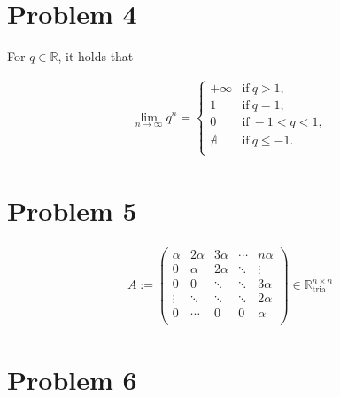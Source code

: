 \documentclass[]{article}
\begin{document}
\newpage
\section*{Problem 4}

For $q \in \mathbb{R}$, it holds that

\begin{align*}
	\lim\limits_{n \to \infty} q^n = 
	\left\{
	\begin{array}{ll}
		+\infty & \textrm{if}\ q > 1, \\
		1 & \textrm{if}\ q = 1, \\
		0 & \textrm{if}\ -1 < q < 1, \\
		\nexists & \textrm{if}\ q \leq -1. \\
	\end{array}
	\right.
\end{align*}


\section*{Problem 5}

\begin{align*}
	A := \left(
	\begin{array}{ccccc}
		\alpha & 2\alpha & 3\alpha & \cdots & n\alpha \\
		0      & \alpha  & 2\alpha & \ddots & \vdots  \\
		0      & 0       & \ddots  & \ddots & 3\alpha \\
		\vdots & \ddots  & \ddots  & \ddots & 2\alpha \\
		0      & \cdots  & 0       & 0      & \alpha  \\
	\end{array}
	\right) \in \mathbb{R}^{n \times n}_{\textrm{tria}}
\end{align*}


\section*{Problem 6}
\end{document}
